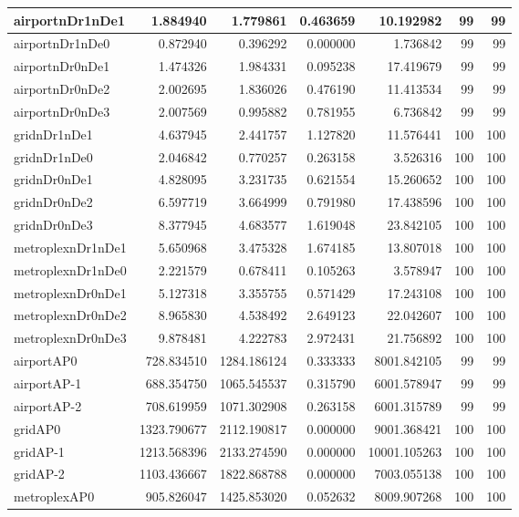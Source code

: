 \begin{longtable}{|l|r|r|r|r|r|r|}
\endlastfoot
airportnDr1nDe1 & 1.884940 & 1.779861 & 0.463659 & 10.192982 & 99 & 99 \\ \hline
airportnDr1nDe0 & 0.872940 & 0.396292 & 0.000000 & 1.736842 & 99 & 99 \\ \hline
airportnDr0nDe1 & 1.474326 & 1.984331 & 0.095238 & 17.419679 & 99 & 99 \\ \hline
airportnDr0nDe2 & 2.002695 & 1.836026 & 0.476190 & 11.413534 & 99 & 99 \\ \hline
airportnDr0nDe3 & 2.007569 & 0.995882 & 0.781955 & 6.736842 & 99 & 99 \\ \hline
gridnDr1nDe1 & 4.637945 & 2.441757 & 1.127820 & 11.576441 & 100 & 100 \\ \hline
gridnDr1nDe0 & 2.046842 & 0.770257 & 0.263158 & 3.526316 & 100 & 100 \\ \hline
gridnDr0nDe1 & 4.828095 & 3.231735 & 0.621554 & 15.260652 & 100 & 100 \\ \hline
gridnDr0nDe2 & 6.597719 & 3.664999 & 0.791980 & 17.438596 & 100 & 100 \\ \hline
gridnDr0nDe3 & 8.377945 & 4.683577 & 1.619048 & 23.842105 & 100 & 100 \\ \hline
metroplexnDr1nDe1 & 5.650968 & 3.475328 & 1.674185 & 13.807018 & 100 & 100 \\ \hline
metroplexnDr1nDe0 & 2.221579 & 0.678411 & 0.105263 & 3.578947 & 100 & 100 \\ \hline
metroplexnDr0nDe1 & 5.127318 & 3.355755 & 0.571429 & 17.243108 & 100 & 100 \\ \hline
metroplexnDr0nDe2 & 8.965830 & 4.538492 & 2.649123 & 22.042607 & 100 & 100 \\ \hline
metroplexnDr0nDe3 & 9.878481 & 4.222783 & 2.972431 & 21.756892 & 100 & 100 \\ \hline
airportAP0 & 728.834510 & 1284.186124 & 0.333333 & 8001.842105 & 99 & 99 \\ \hline
airportAP-1 & 688.354750 & 1065.545537 & 0.315790 & 6001.578947 & 99 & 99 \\ \hline
airportAP-2 & 708.619959 & 1071.302908 & 0.263158 & 6001.315789 & 99 & 99 \\ \hline
gridAP0 & 1323.790677 & 2112.190817 & 0.000000 & 9001.368421 & 100 & 100 \\ \hline
gridAP-1 & 1213.568396 & 2133.274590 & 0.000000 & 10001.105263 & 100 & 100 \\ \hline
gridAP-2 & 1103.436667 & 1822.868788 & 0.000000 & 7003.055138 & 100 & 100 \\ \hline
metroplexAP0 & 905.826047 & 1425.853020 & 0.052632 & 8009.907268 & 100 & 100 \\ \hline

\end{longtable}
